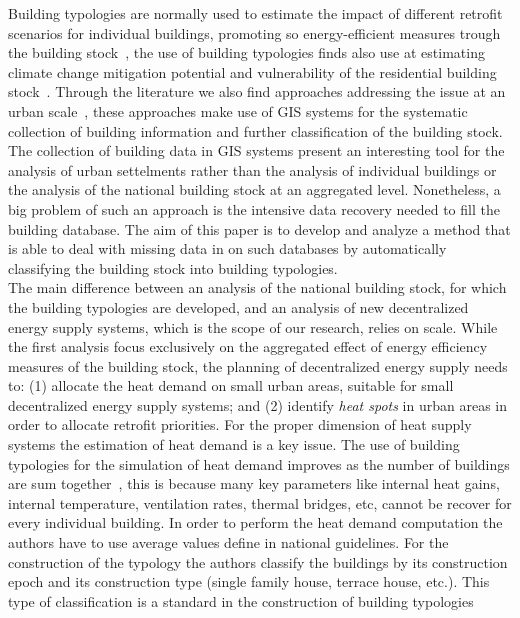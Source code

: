 Building typologies are normally used to estimate the impact of different retrofit scenarios
for individual buildings, promoting so energy-efficient measures trough the building
stock~\cite{Kragh.2013, Singh.2013, Dascalaki.2011,
TABULAProjectTeam.2012}, the use of building typologies finds also use at
estimating climate change mitigation potential and vulnerability of the residential
building stock~\cite{Hrabovszky.2013}. Through the literature we
also find approaches addressing the issue at an urban
scale~\cite{Caputo.2013}, these approaches make use of GIS systems for the
systematic collection of building information and further classification of the
building stock. The collection of building data in GIS systems present an
interesting tool for the analysis of urban settelments rather than the analysis of
individual buildings or the analysis of the national building stock at an
aggregated level. Nonetheless, a big problem of such an approach is the
intensive data recovery needed to fill the building database. The aim of this
paper is to develop and analyze a method that is able to deal with missing data in
on such databases by automatically classifying the building stock into building typologies.\\

The main difference between an analysis of the national building stock, for
which the building typologies are developed, and an analysis of new decentralized
energy supply systems, which is the scope of our research, relies on scale.
While the first analysis focus exclusively on the aggregated effect of energy
efficiency measures of the building stock, the planning of decentralized energy
supply needs to:
(1) allocate the heat demand on small urban areas, suitable for small
decentralized energy supply systems; and
(2) identify \textit{heat spots} in urban areas in order to allocate retrofit
priorities.
For the proper dimension of heat supply systems the estimation of heat
demand is a key issue. The use of
building typologies for the simulation of heat demand improves as the number of
buildings are sum together~\cite{Blesl.2007}, this is because many key
parameters like internal heat gains, internal temperature, ventilation rates,
thermal bridges, etc, cannot be recover for every individual building. In order to
perform the heat demand computation the authors have to use average values
define in national guidelines. For the construction of the typology the authors
classify the buildings by its construction epoch and its construction type
(single family house, terrace house, etc.). This type of classification is a
standard in the construction of building typologies~\cite{Ebel.1990,
    ebokifeu.1996, ebokifeu.1998, ebok.2000, ebok.2005, Hildebrandt.2003,
    IWU.2003, Loga.2011, BSU.2011, Hermelink.2011, Kragh.2013,
    Singh.2013, Hrabovszky.2013, Caputo.2013}\\

